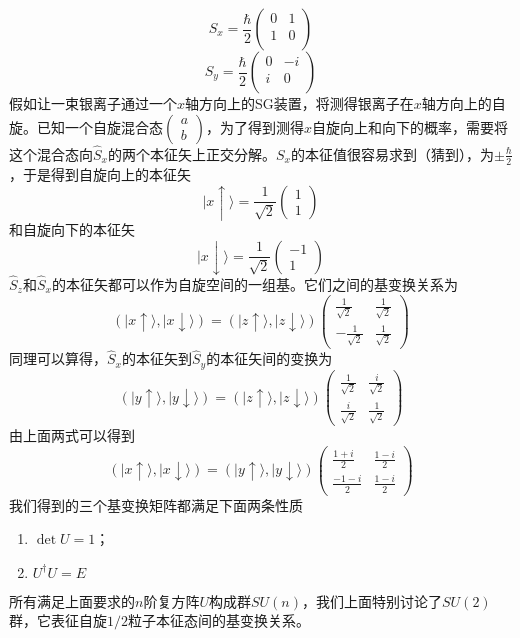 \documentclass[a4paper,11pt]{ctexart}
\newcommand{\beq}{\begin{equation}}
\newcommand{\eeq}{\end{equation}}
\newcommand{\up}{\uparrow}
\newcommand{\down}{\downarrow}
\begin{document}
\beq
S_x = \frac{\hbar}{2} \begin{pmatrix}
 0 & 1 \\
 1 & 0 \\
\end{pmatrix}
\eeq
\beq
S_y = \frac{\hbar}{2} \begin{pmatrix}
 0 & -i \\
 i & 0 \\
\end{pmatrix}
\eeq
假如让一束银离子通过一个$x$轴方向上的SG装置，将测得银离子在$x$轴方向上的自旋。已知一个自旋混合态$\begin{pmatrix} a \\ b \end{pmatrix}$，为了得到测得$x$自旋向上和向下的概率，需要将这个混合态向$\hat{S}_x$的两个本征矢上正交分解。$S_x$的本征值很容易求到（猜到），为$\pm \frac{\hbar}{2}$，于是得到自旋向上的本征矢
\beq
\mid x\up \rangle = \frac{1}{\sqrt{2}} \begin{pmatrix} 1 \\ 1 \end{pmatrix}
\eeq
和自旋向下的本征矢
\beq
\mid x\down \rangle = \frac{1}{\sqrt{2}} \begin{pmatrix} -1 \\ 1 \end{pmatrix}
\eeq
$\hat{S}_z$和$\hat{S}_x$的本征矢都可以作为自旋空间的一组基。它们之间的基变换关系为
\beq
(\mid x\up \rangle, \mid x\down \rangle) =  (\mid z\up \rangle, \mid z\down \rangle) \begin{pmatrix} \frac{1}{\sqrt{2}} & \frac{1}{\sqrt{2}} \\ -\frac{1}{\sqrt{2}} &  \frac{1}{\sqrt{2}} \end{pmatrix} 
\eeq
同理可以算得，$\hat{S}_x$的本征矢到$\hat{S}_y$的本征矢间的变换为
\beq
(\mid y\up \rangle, \mid y\down \rangle) =  (\mid z\up \rangle, \mid z\down \rangle) \begin{pmatrix} \frac{1}{\sqrt{2}} & \frac{i}{\sqrt{2}} \\ \frac{i}{\sqrt{2}} &  \frac{1}{\sqrt{2}} \end{pmatrix} 
\eeq
由上面两式可以得到
\beq
(\mid x\up \rangle, \mid x\down \rangle) = (\mid y\up \rangle, \mid y\down \rangle) \begin{pmatrix} \frac{1+i}{2} & \frac{1-i}{2} \\ \frac{-1-i}{2} &  \frac{1-i}{2} \end{pmatrix}
\eeq
我们得到的三个基变换矩阵都满足下面两条性质
\begin{enumerate}
\item $\det U = 1$；
\item $U^\dagger U = E$
\end{enumerate}
所有满足上面要求的$n$阶复方阵$U$构成群$SU(n)$，我们上面特别讨论了$SU(2)$群，它表征自旋$1/2$粒子本征态间的基变换关系。
\end{document}
